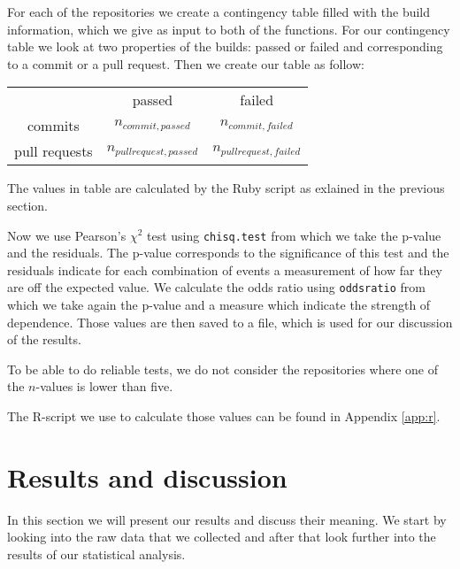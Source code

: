 \documentclass[a4paper,11pt]{article}
\begin{document}
			For each of the repositories we create a contingency table filled with the build information,
			which we give as input to both of the functions.
			For our contingency table we look at two properties of the builds: passed or failed and corresponding to a commit or
			a pull request.
			Then we create our table as follow:
			
			\begin{center}
			\begin{tabular}{ccc}
			 & passed & failed\\
			commits & $n_{commit, passed}$ & $n_{commit, failed}$\\
			pull requests & $n_{pull request, passed}$ & $n_{pull request, failed}$
			\end{tabular}
			\end{center}
			
			The values in table are calculated by the Ruby script as exlained in the previous section.
			
			Now we use Pearson's $\chi^2$ test using \texttt{chisq.test} from which we take the p-value and the residuals.
			The p-value corresponds to the significance of this test and the residuals indicate for each combination of events a measurement of how far they are off the expected value.
			We calculate the odds ratio using \texttt{oddsratio} from which we take again the p-value and a measure which
			indicate the strength of dependence.
		  Those values are then saved to a file, which is used for our discussion of the results.
		  
		  To be able to do reliable tests, we do not consider the repositories where one of the $n$-values is lower than five.
		  
		  The R-script we use to calculate those values can be found in Appendix \ref{app:r}.
			
	
	\section{Results and discussion}
		In this section we will present our results and discuss their meaning. We start by looking into the raw data that we collected and after that look further into the results of our statistical analysis.
		
\end{document}
